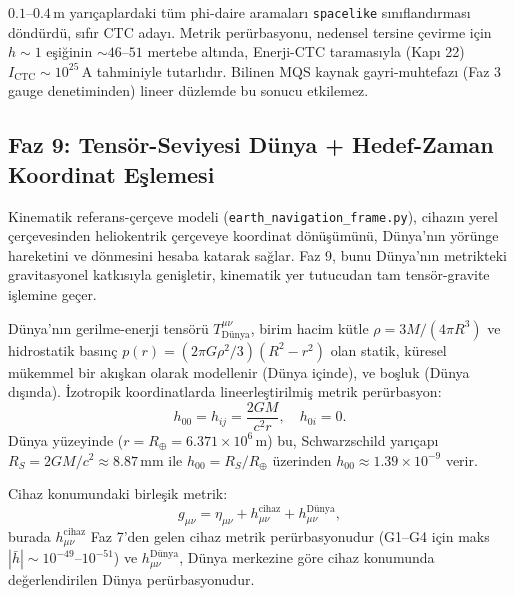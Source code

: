 $0.1$--$0.4\,\text{m}$ yarıçaplardaki tüm phi-daire aramaları \texttt{spacelike} sınıflandırması döndürdü, sıfır CTC adayı. Metrik perürbasyonu, nedensel tersine çevirme için $h\sim 1$ eşiğinin $\sim 46$--$51$ mertebe altında, Enerji-CTC taramasıyla (Kapı 22) $I_{\text{CTC}} \sim 10^{25}\,\text{A}$ tahminiyle tutarlıdır. Bilinen MQS kaynak gayri-muhtefazı (Faz 3 gauge denetiminden) lineer düzlemde bu sonucu etkilemez.

\subsection{Faz 9: Tensör-Seviyesi Dünya + Hedef-Zaman Koordinat Eşlemesi}

Kinematik referans-çerçeve modeli (\texttt{earth\_navigation\_frame.py}), cihazın yerel çerçevesinden heliokentrik çerçeveye koordinat dönüşümünü, Dünya'nın yörünge hareketini ve dönmesini hesaba katarak sağlar. Faz 9, bunu Dünya'nın metrikteki gravitasyonel katkısıyla genişletir, kinematik yer tutucudan tam tensör-gravite işlemine geçer.

Dünya'nın gerilme-enerji tensörü $T^{\mu\nu}_{\text{Dünya}}$, birim hacim kütle $\rho = 3M/(4\pi R^3)$ ve hidrostatik basınç $p(r) = (2\pi G\rho^2/3)(R^2 - r^2)$ olan statik, küresel mükemmel bir akışkan olarak modellenir (Dünya içinde), ve boşluk (Dünya dışında). İzotropik koordinatlarda lineerleştirilmiş metrik perürbasyon:
\begin{equation}
h_{00} = h_{ij} = \frac{2GM}{c^2 r}, \quad h_{0i} = 0.
\end{equation}
Dünya yüzeyinde ($r = R_\oplus = 6.371\times 10^6\,\text{m}$) bu, Schwarzschild yarıçapı $R_S = 2GM/c^2 \approx 8.87\,\text{mm}$ ile $h_{00} = R_S/R_\oplus$ üzerinden $h_{00} \approx 1.39\times 10^{-9}$ verir.

Cihaz konumundaki birleşik metrik:
\begin{equation}
g_{\mu\nu} = \eta_{\mu\nu} + h^{\text{cihaz}}_{\mu\nu} + h^{\text{Dünya}}_{\mu\nu},
\end{equation}
burada $h^{\text{cihaz}}_{\mu\nu}$ Faz 7'den gelen cihaz metrik perürbasyonudur (G1--G4 için maks $|\bar{h}| \sim 10^{-49}$--$10^{-51}$) ve $h^{\text{Dünya}}_{\mu\nu}$, Dünya merkezine göre cihaz konumunda değerlendirilen Dünya perürbasyonudur.

